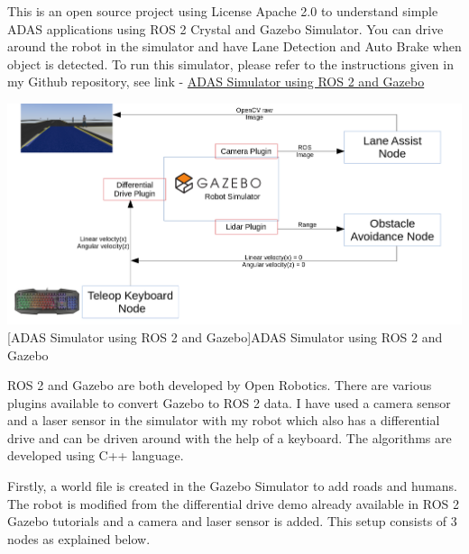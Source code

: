 \documentclass[%
xelatex,
	oneside,		%
	12pt,			%
	parskip=half,	%
	abstracton,
	chapterprefix=true%
    appendixprefix=true]
{scrbook}
\begin{document}
\rofoot[\pagemark]{\pagemark}
This is an open source project using License Apache 2.0 to understand simple ADAS applications using ROS 2 Crystal and Gazebo Simulator. You can drive around the robot in the simulator and have Lane Detection and Auto Brake when object is detected. To run this simulator, please refer to the instructions given in my Github repository, see link - \href{https://github.com/Viplav04/ADAS-ROS2-Gazebo-Simulator}{ADAS Simulator using ROS 2 and Gazebo}\cite{ADASsim}
	\begin{center}
\includegraphics[scale=0.26]{fig/ros2adas.png}
[ADAS Simulator using ROS 2 and Gazebo]{ADAS Simulator using ROS 2 and Gazebo}
\label{fig:ADAS}

\end{center}

ROS 2 and Gazebo are both developed by Open Robotics. There are various plugins available to convert Gazebo to ROS 2 data. I have used a camera sensor and a laser sensor in the simulator with my robot which also has a differential drive and can be driven around with the help of a keyboard. The algorithms are developed using C++ language.

Firstly, a world file is created in the Gazebo Simulator to add roads and humans. The robot is modified from the differential drive demo already available in ROS 2 Gazebo tutorials and a camera and laser sensor is added. This setup consists of 3 nodes as explained below.
\end{document}
